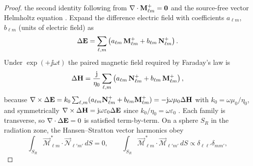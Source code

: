 \begin{proof}
the second identity following from $\nabla\cdot\mathbf M_{\ell m}^{+}=\mathbf{0}$ and the source-free vector Helmholtz equation \cite{stratton1941,harrington2001}. Expand the difference electric field with coefficients $a_{\ell m}$, $b_{\ell m}$ (units of electric field) as
\begin{equation}
\label{eq:ch1.vsw-delta-E-expansion}
\Delta\mathbf{E}
=\sum_{\ell,m}\left(a_{\ell m}\,\mathbf M_{\ell m}^{+}
+b_{\ell m}\,\mathbf N_{\ell m}^{+}\right).
\end{equation}
Under $\exp(+\jj\omega t)$ the paired magnetic field required by Faraday's law is
\begin{equation}
\label{eq:ch1.vsw-delta-H-expansion}
\Delta\mathbf{H}
=\frac{\mathrm{j}}{\eta_0}\sum_{\ell,m}\left(a_{\ell m}\,\mathbf N_{\ell m}^{+}
+b_{\ell m}\,\mathbf M_{\ell m}^{+}\right),
\end{equation}
because $\nabla\times\Delta\mathbf{E}=k_0\sum_{\ell,m}(a_{\ell m}\mathbf N_{\ell m}^{+}+b_{\ell m}\mathbf M_{\ell m}^{+})=-\mathrm{j}\omega\mu_0\Delta\mathbf{H}$ with $k_0=\omega\mu_0/\eta_0$, and symmetrically $\nabla\times\Delta\mathbf{H}=\mathrm{j}\omega\varepsilon_0\Delta\mathbf{E}$ since $k_0/\eta_0=\omega\varepsilon_0$ \cite{stratton1941,harrington2001}. Each family is transverse, so $\nabla\cdot\Delta\mathbf{E}=0$ is satisfied term-by-term. On a sphere $S_R$ in the radiation zone, the Hansen--Stratton vector harmonics obey
\begin{equation}
\label{eq:ch1.vsw-mn-orthogonality}
\int_{S_R}\vec{\mathcal{M}}_{\ell m}^{*}\!\cdot\vec{\mathcal{N}}_{\ell' m'}\,dS=0,
\qquad
\int_{S_R}\vec{\mathcal{M}}_{\ell m}^{*}\!\cdot\vec{\mathcal{M}}_{\ell' m'}\,dS\propto\delta_{\ell\ell'}\delta_{mm'},
\end{equation}

\end{proof}
